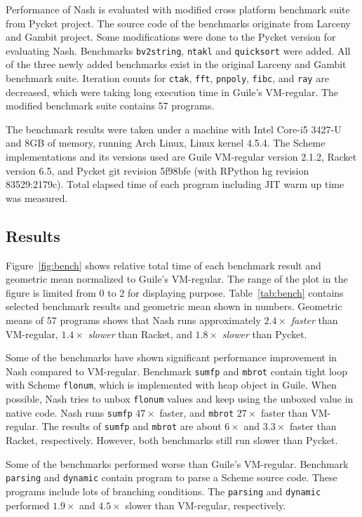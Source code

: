 \documentclass[preprint, 10pt]{sigplanconf}
\begin{document}
Performance of Nash is evaluated with modified cross platform benchmark suite
from Pycket project. The source code of the benchmarks originate from Larceny
and Gambit project. Some modifications were done to the Pycket version for
evaluating Nash. Benchmarks \texttt{bv2string}, \texttt{ntakl} and
\texttt{quicksort} were added. All of the three newly added benchmarks exist in
the original Larceny and Gambit benchmark suite. Iteration counts for
\texttt{ctak}, \texttt{fft}, \texttt{pnpoly}, \texttt{fibc}, and \texttt{ray}
are decreased, which were taking long execution time in Guile's VM-regular. The
modified benchmark suite contains 57 programs.

The benchmark results were taken under a machine with Intel Core-i5 3427-U and
8GB of memory, running Arch Linux, Linux kernel 4.5.4. The Scheme
implementations and its versions used are Guile VM-regular version 2.1.2, Racket
version 6.5, and Pycket git revision 5f98bfe (with RPython hg revision
83529:2179c). Total elapsed time of each program including JIT warm up time was
measured.

\subsection{Results}

Figure~\ref{fig:bench} shows relative total time of each benchmark result and
geometric mean normalized to Guile's VM-regular. The range of the plot in the
figure is limited from 0 to 2 for displaying
purpose. Table~\hyperref[tab:bench]{\ref{tab:bench}} contains selected benchmark
results and geometric mean shown in numbers.  Geometric means of 57 programs
shows that Nash runs approximately $2.4\times$ \textit{faster} than VM-regular,
$1.4\times$ \textit{slower} than Racket, and $1.8\times$ \textit{slower} than
Pycket.

Some of the benchmarks have shown significant performance improvement in Nash
compared to VM-regular. Benchmark \texttt{sumfp} and \texttt{mbrot} contain
tight loop with Scheme \texttt{flonum}, which is implemented with heap object in
Guile. When possible, Nash tries to unbox \texttt{flonum} values and keep using
the unboxed value in native code. Nash runs \texttt{sumfp} $47\times$ faster,
and \texttt{mbrot} $27\times$ faster than VM-regular. The results of
\texttt{sumfp} and \texttt{mbrot} are about $6\times$ and $3.3\times$ faster
than Racket, respectively. However, both benchmarks still run slower than
Pycket.

Some of the benchmarks performed worse than Guile's VM-regular. Benchmark
\texttt{parsing} and \texttt{dynamic} contain program to parse a Scheme source
code. These programs include lots of branching conditions. The \texttt{parsing}
and \texttt{dynamic} performed $1.9\times$ and $4.5\times$ slower than
VM-regular, respectively.
\end{document}
